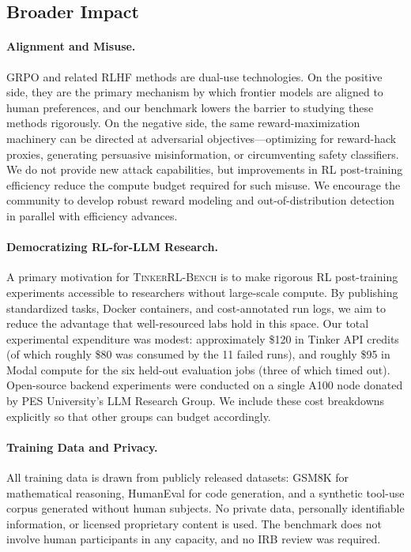 \documentclass{article}
\newcommand{\ours}{\textsc{TinkerRL-Bench}}
\begin{document}
\subsection{Broader Impact}
\label{sec:impact}

\paragraph{Alignment and Misuse.}
GRPO and related RLHF methods are dual-use technologies. On the positive side,
they are the primary mechanism by which frontier models are aligned to human
preferences, and our benchmark lowers the barrier to studying these methods
rigorously. On the negative side, the same reward-maximization machinery can
be directed at adversarial objectives---optimizing for reward-hack proxies,
generating persuasive misinformation, or circumventing safety classifiers. We
do not provide new attack capabilities, but improvements in RL post-training
efficiency reduce the compute budget required for such misuse. We encourage
the community to develop robust reward modeling and out-of-distribution
detection in parallel with efficiency advances.

\paragraph{Democratizing RL-for-LLM Research.}
A primary motivation for \ours{} is to make rigorous RL post-training
experiments accessible to researchers without large-scale compute. By
publishing standardized tasks, Docker containers, and cost-annotated run
logs, we aim to reduce the advantage that well-resourced labs hold in this
space. Our total experimental expenditure was modest: approximately \$120 in
Tinker API credits (of which roughly \$80 was consumed by the 11 failed runs),
and roughly \$95 in Modal compute for the six held-out evaluation jobs
(three of which timed out). Open-source backend experiments were conducted on
a single A100 node donated by PES University's LLM Research Group. We include
these cost breakdowns explicitly so that other groups can budget accordingly.

\paragraph{Training Data and Privacy.}
All training data is drawn from publicly released datasets: GSM8K
\citep{cobbe2021training} for mathematical reasoning, HumanEval
\citep{chen2021codex} for code generation, and a synthetic tool-use corpus
generated without human subjects. No private data, personally identifiable
information, or licensed proprietary content is used. The benchmark does not
involve human participants in any capacity, and no IRB review was required.
\end{document}
